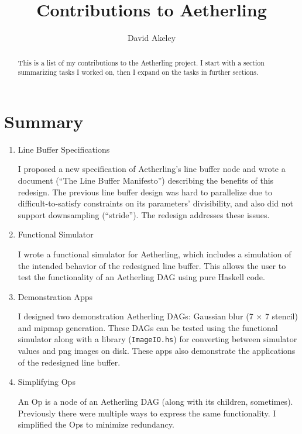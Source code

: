 \documentclass[11pt]{article}
\begin{document}
\title{Contributions to Aetherling}
\author{David Akeley}
\maketitle

\begin{abstract}
This is a list of my contributions to the Aetherling project. I start
with a section summarizing tasks I worked on, then I expand on the
tasks in further sections.
\end{abstract}

\section{Summary}

\begin{enumerate}

\item Line Buffer Specifications

I proposed a new specification of Aetherling's line buffer node and
wrote a document (``The Line Buffer Manifesto'') describing the
benefits of this redesign. The previous line buffer design was hard to
parallelize due to difficult-to-satisfy constraints on its parameters'
divisibility, and also did not support downsampling (``stride'').
The redesign addresses these issues.

\item Functional Simulator

I wrote a functional simulator for Aetherling, which includes a
simulation of the intended behavior of the redesigned line
buffer. This allows the user to test the functionality of an
Aetherling DAG using pure Haskell code.

\item Demonstration Apps

I designed two demonstration Aetherling DAGs: Gaussian blur (7 $\times$
7 stencil) and mipmap generation. These DAGs can be tested using the
functional simulator along with a library (\texttt{ImageIO.hs}) for
converting between simulator values and png images on disk. These apps
also demonstrate the applications of the redesigned line buffer.

\item Simplifying Ops

An Op is a node of an Aetherling DAG (along with its children,
sometimes). Previously there were multiple ways to express the same
functionality. I simplified the Ops to minimize redundancy.


\end{enumerate}
\end{document}
